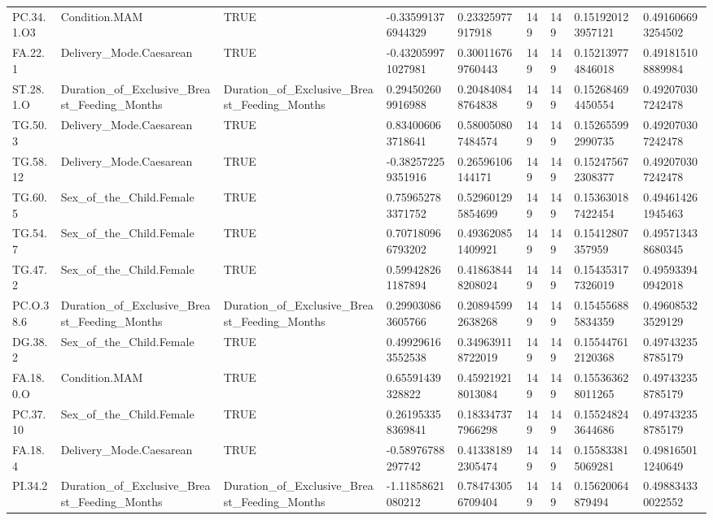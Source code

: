 \begin{longtable}{lllllllll}
PC.34.1.O3 & Condition.MAM & TRUE & -0.335991376944329 & 0.23325977917918 & 149 & 149 & 0.151920123957121 & 0.491606693254502 \\
FA.22.1 & Delivery\_Mode.Caesarean & TRUE & -0.432059971027981 & 0.300116769760443 & 149 & 149 & 0.152139774846018 & 0.491815108889984 \\
ST.28.1.O & Duration\_of\_Exclusive\_Breast\_Feeding\_Months & Duration\_of\_Exclusive\_Breast\_Feeding\_Months & 0.294502609916988 & 0.204840848764838 & 149 & 149 & 0.152684694450554 & 0.492070307242478 \\
TG.50.3 & Delivery\_Mode.Caesarean & TRUE & 0.834006063718641 & 0.580050807484574 & 149 & 149 & 0.152655992990735 & 0.492070307242478 \\
TG.58.12 & Delivery\_Mode.Caesarean & TRUE & -0.382572259351916 & 0.26596106144171 & 149 & 149 & 0.152475672308377 & 0.492070307242478 \\
TG.60.5 & Sex\_of\_the\_Child.Female & TRUE & 0.759652783371752 & 0.529601295854699 & 149 & 149 & 0.153630187422454 & 0.494614261945463 \\
TG.54.7 & Sex\_of\_the\_Child.Female & TRUE & 0.707180966793202 & 0.493620851409921 & 149 & 149 & 0.15412807357959 & 0.495713438680345 \\
TG.47.2 & Sex\_of\_the\_Child.Female & TRUE & 0.599428261187894 & 0.418638448208024 & 149 & 149 & 0.154353177326019 & 0.495933940942018 \\
PC.O.38.6 & Duration\_of\_Exclusive\_Breast\_Feeding\_Months & Duration\_of\_Exclusive\_Breast\_Feeding\_Months & 0.299030863605766 & 0.208945992638268 & 149 & 149 & 0.154556885834359 & 0.496085323529129 \\
DG.38.2 & Sex\_of\_the\_Child.Female & TRUE & 0.499296163552538 & 0.349639118722019 & 149 & 149 & 0.155447612120368 & 0.497432358785179 \\
FA.18.0.O & Condition.MAM & TRUE & 0.65591439328822 & 0.459219218013084 & 149 & 149 & 0.155363628011265 & 0.497432358785179 \\
PC.37.10 & Sex\_of\_the\_Child.Female & TRUE & 0.261953358369841 & 0.183347377966298 & 149 & 149 & 0.155248243644686 & 0.497432358785179 \\
FA.18.4 & Delivery\_Mode.Caesarean & TRUE & -0.58976788297742 & 0.413381892305474 & 149 & 149 & 0.155833815069281 & 0.498165011240649 \\
PI.34.2 & Duration\_of\_Exclusive\_Breast\_Feeding\_Months & Duration\_of\_Exclusive\_Breast\_Feeding\_Months & -1.11858621080212 & 0.784743056709404 & 149 & 149 & 0.15620064879494 & 0.498834330022552 \\

\end{longtable}
